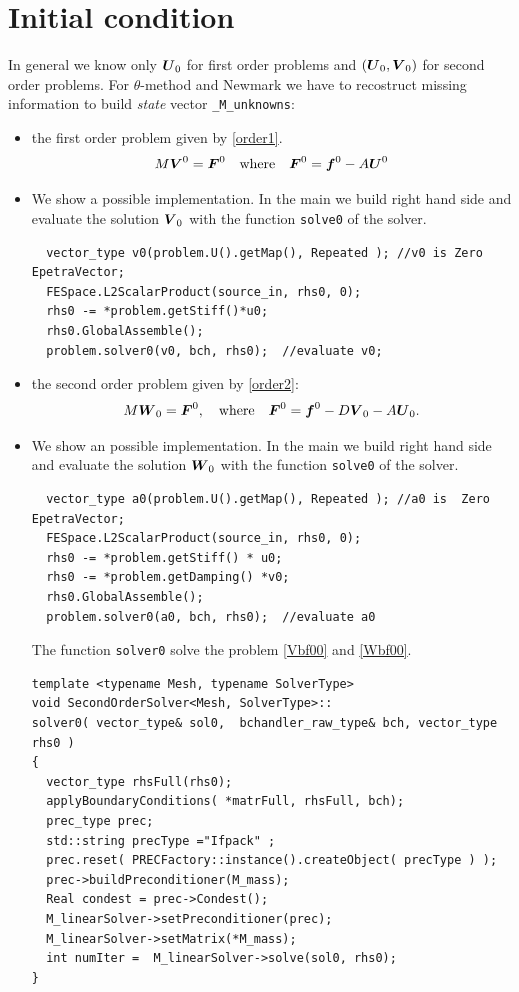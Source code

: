 \documentclass[english,a4paper]{article}
\newcommand{\Ubf}{\text{\mbox{\boldmath $U$}}}
\newcommand{\Abf}{\text{\mbox{\boldmath $W$}}}
\newcommand{\fbf}{\text{\mbox{\boldmath $f$}}}
\newcommand{\Fbf}{\text{\mbox{\boldmath $F$}}}
\newcommand{\Wbf}{\text{\mbox{\boldmath $V$}}}
\begin{document}
\section{Initial condition}\label{start}
In general we know only $\Ubf_0$ for first order problems and
$(\Ubf_0, \Wbf_0)$ for second order problems.
For $\theta$-method and Newmark we have to recostruct missing information
to build {\sl state} vector \verb"_M_unknowns":
\begin{itemize}
\item the first order problem  given by \eqref{order1}.
\begin{equation}\label{Vbf00}
M \Wbf^0= \Fbf^0\quad\text{where}\quad \Fbf^0= \fbf^0 - A \Ubf^0 
\end{equation}
\item[]We show a possible implementation. In the main we build right
  hand side and evaluate the solution $\Wbf_0$ with the function
  \verb"solve0" of the solver.
\begin{verbatim}
  vector_type v0(problem.U().getMap(), Repeated ); //v0 is Zero EpetraVector;
  FESpace.L2ScalarProduct(source_in, rhs0, 0); 
  rhs0 -= *problem.getStiff()*u0; 
  rhs0.GlobalAssemble();
  problem.solver0(v0, bch, rhs0);  //evaluate v0;
\end{verbatim}
 \item the second order problem given by \eqref{order2}:
\begin{equation}\label{Wbf00}
M\Abf_0= \Fbf^0, \quad\text{where}\quad \Fbf^0= \fbf^0- D\Wbf_0-A \Ubf_0.
\end{equation}
\item[]We show an possible implementation. In the main we build right
  hand side and evaluate the solution $\Abf_0$ with the function
  \verb"solve0" of the solver.
\begin{verbatim}
  vector_type a0(problem.U().getMap(), Repeated ); //a0 is  Zero EpetraVector;
  FESpace.L2ScalarProduct(source_in, rhs0, 0);
  rhs0 -= *problem.getStiff() * u0; 
  rhs0 -= *problem.getDamping() *v0;
  rhs0.GlobalAssemble();
  problem.solver0(a0, bch, rhs0);  //evaluate a0
\end{verbatim}
The function \verb"solver0" solve the problem \eqref{Vbf00} and
\eqref{Wbf00}.
\begin{verbatim}
template <typename Mesh, typename SolverType>
void SecondOrderSolver<Mesh, SolverType>::
solver0( vector_type& sol0,  bchandler_raw_type& bch, vector_type  rhs0 )
{
  vector_type rhsFull(rhs0); 
  applyBoundaryConditions( *matrFull, rhsFull, bch);
  prec_type prec;
  std::string precType ="Ifpack" ;
  prec.reset( PRECFactory::instance().createObject( precType ) );
  prec->buildPreconditioner(M_mass);
  Real condest = prec->Condest();
  M_linearSolver->setPreconditioner(prec);
  M_linearSolver->setMatrix(*M_mass);
  int numIter =  M_linearSolver->solve(sol0, rhs0);
}
\end{verbatim}
\end{itemize}
\end{document}
